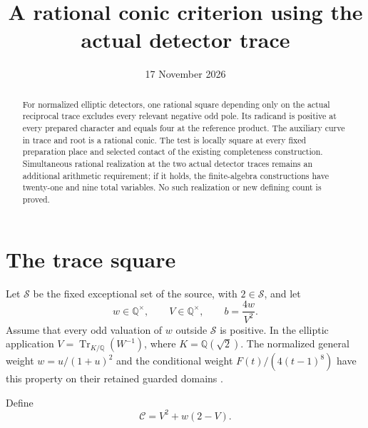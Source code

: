 \documentclass[11pt,a4paper]{article}
\title{A rational conic criterion using the actual detector trace}
\author{}\date{17 November 2026}
\newcommand{\Q}{\mathbb Q}\newcommand{\Z}{\mathbb Z}
\DeclareMathOperator{\Tr}{Tr}\DeclareMathOperator{\Nm}{N}
\begin{document}
\maketitle
\begin{abstract}
For normalized elliptic detectors, one rational square depending only
on the actual reciprocal trace excludes every relevant negative odd
pole. Its radicand is positive at every prepared character and equals
four at the reference product. The auxiliary curve in trace and root
is a rational conic. The test is locally square at every fixed
preparation place and selected contact of the existing completeness
construction. Simultaneous rational realization at the two actual
detector traces remains an additional arithmetic requirement; if it
holds, the finite-algebra constructions have twenty-one and nine
total variables. No such realization or new defining count is proved.
\end{abstract}

\section{The trace square}

Let \(\mathcal S\) be the fixed exceptional set of the source, with
\(2\in\mathcal S\), and let
\[
 w\in\Q^\times,\qquad V\in\Q^\times,\qquad b=\frac{4w}{V^2}.
\]
Assume that every odd valuation of \(w\) outside \(\mathcal S\)
is positive. In the elliptic application \(V=\Tr_{K/\Q}(W^{-1})\),
where \(K=\Q(\sqrt2)\). The normalized general weight
\(w=u/(1+u)^2\) and the conditional weight
\(F(t)/(4(t-1)^8)\) have this property on their retained guarded
domains \cite{Native,Normalized}.

Define
\begin{equation}\label{eq:conic}
                       \mathcal C=V^2+w(2-V).
\end{equation}
\end{document}
